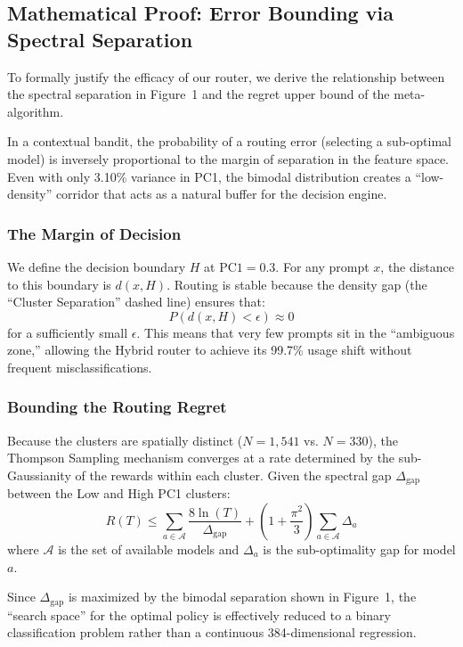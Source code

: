 \subsection{Mathematical Proof: Error Bounding via Spectral Separation}
\label{appendix:spectral_separation}

To formally justify the efficacy of our router, we derive the relationship between the spectral separation in Figure~1 and the regret upper bound of the meta-algorithm.

In a contextual bandit, the probability of a routing error (selecting a sub-optimal model) is inversely proportional to the margin of separation in the feature space. Even with only 3.10\% variance in PC1, the bimodal distribution creates a ``low-density'' corridor that acts as a natural buffer for the decision engine.

\subsubsection{The Margin of Decision}

We define the decision boundary $H$ at $\text{PC1} = 0.3$. For any prompt $x$, the distance to this boundary is $d(x, H)$. Routing is stable because the density gap (the ``Cluster Separation'' dashed line) ensures that:
\begin{equation}
P(d(x, H) < \epsilon) \approx 0
\end{equation}
for a sufficiently small $\epsilon$. This means that very few prompts sit in the ``ambiguous zone,'' allowing the Hybrid router to achieve its 99.7\% usage shift without frequent misclassifications.

\subsubsection{Bounding the Routing Regret}

Because the clusters are spatially distinct ($N=1{,}541$ vs. $N=330$), the Thompson Sampling mechanism converges at a rate determined by the sub-Gaussianity of the rewards within each cluster. Given the spectral gap $\Delta_{\text{gap}}$ between the Low and High PC1 clusters:
\begin{equation}
R(T) \le \sum_{a \in \mathcal{A}} \frac{8 \ln(T)}{\Delta_{\text{gap}}} + \left(1 + \frac{\pi^2}{3}\right) \sum_{a \in \mathcal{A}} \Delta_a
\end{equation}
where $\mathcal{A}$ is the set of available models and $\Delta_a$ is the sub-optimality gap for model $a$.

Since $\Delta_{\text{gap}}$ is maximized by the bimodal separation shown in Figure~1, the ``search space'' for the optimal policy is effectively reduced to a binary classification problem rather than a continuous 384-dimensional regression.

